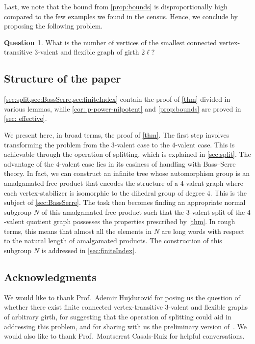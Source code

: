 \documentclass[a4paper]{amsart}
\newcommand{\0}{\mathbf{0}}
\theoremstyle{definition}
\newtheorem{question}[thmx]{Question}
\begin{document}
Last, we note that the bound from \cref{prop:bounds} is disproportionally high compared to the few examples we found in the census. Hence, we conclude by proposing the following problem.
\begin{question}
    What is the number of vertices of the smallest connected vertex-transitive $3$-valent and flexible graph of girth $2\ell$?
\end{question}


\subsection{Structure of the paper} \cref{sec:split,sec:BassSerre,sec:finiteIndex} contain the proof of \cref{thm} divided in various lemmas, while \cref{cor: p-power-nilpotent} and \cref{prop:bounds} are proved in \cref{sec: effective}.

We present here, in broad terms, the proof of \cref{thm}. The first step involves transforming the problem from the $3$-valent case to the $4$-valent case. This is achievable through the operation of splitting, which is explained in \cref{sec:split}. The advantage of the $4$-valent case lies in its easiness of handling with Bass--Serre theory. In fact, we can construct an infinite tree whose automorphism group is an amalgamated free product that encodes the structure of a $4$-valent graph where each vertex-stabilizer is isomorphic to the dihedral group of degree $4$. This is the subject of \cref{sec:BassSerre}. The task then becomes finding an appropriate normal subgroup $N$ of this amalgamated free product such that the $3$-valent split of the $4$-valent quotient graph possesses the properties prescribed by \cref{thm}. In rough terms, this means that almost all the elements in $N$ are long words with respect to the natural length of amalgamated products. The construction of this subgroup $N$ is addressed in \cref{sec:finiteIndex}.


\subsection{Acknowledgments}
We would like to thank Prof.~Ademir Hujdurović for posing us the question of whether there exist finite connected vertex-transitive $3$-valent and flexible graphs of arbitrary girth, for suggesting that the operation of splitting could aid in addressing this problem, and for sharing with us the preliminary version of~\cite{Ademir}. We would also like to thank Prof.~Montserrat Casals-Ruiz for helpful conversations.
\end{document}
